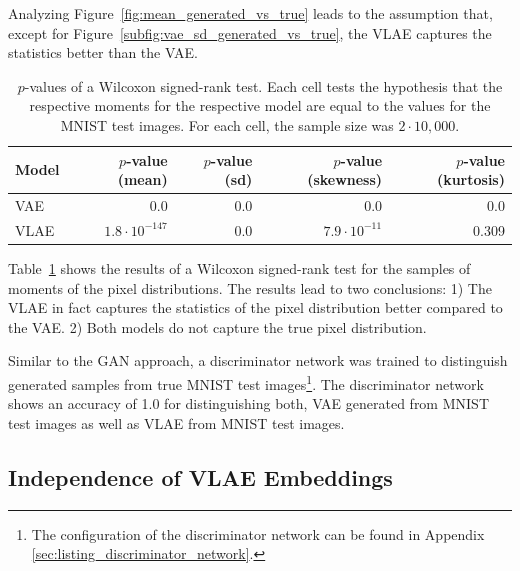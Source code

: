 Analyzing Figure~\ref{fig:mean_generated_vs_true} leads to the assumption that, except for Figure~\ref{subfig:vae_sd_generated_vs_true}, the \ac{VLAE} captures the statistics better than the \ac{VAE}.
\begin{table}
    \begin{tabular}{lrrrr}
        \toprule
        Model & $p$-value (mean) & $p$-value (sd) & $p$-value (skewness) & $p$-value (kurtosis)\\
        \midrule
        \ac{VAE} & 0.0 & 0.0 & 0.0 & 0.0 \\
        \ac{VLAE} & $1.8\cdot 10^{-147}$ & 0.0 & $7.9\cdot 10^{-11}$ & 0.309\\
        \bottomrule
    \end{tabular}
    \caption{$p$-values of a Wilcoxon signed-rank test. Each cell tests the hypothesis that the respective moments for the respective model are equal to the values for the \textsc{MNIST} test images. For each cell, the sample size was $2\cdot 10,000$.}
    \label{tab:vae-vlae-mnist}
\end{table}
Table~\ref{tab:vae-vlae-mnist} shows the results of a Wilcoxon signed-rank test for the samples of moments of the pixel distributions.
The results lead to two conclusions: 1) The \ac{VLAE} in fact captures the statistics of the pixel distribution better compared to the \ac{VAE}.
2) Both models do not capture the true pixel distribution.

Similar to the \ac{GAN} approach, a discriminator network was trained to distinguish generated samples from true \textsc{MNIST} test images\footnote{The configuration of the discriminator network can be found in Appendix \ref{sec:listing_discriminator_network}.}.
The discriminator network shows an accuracy of 1.0 for distinguishing both, \ac{VAE} generated from \textsc{MNIST} test images as well as  \ac{VLAE} from \textsc{MNIST} test images.

\subsection{Independence of VLAE Embeddings}\label{subsec:independence-of-vlae-embeddings}

